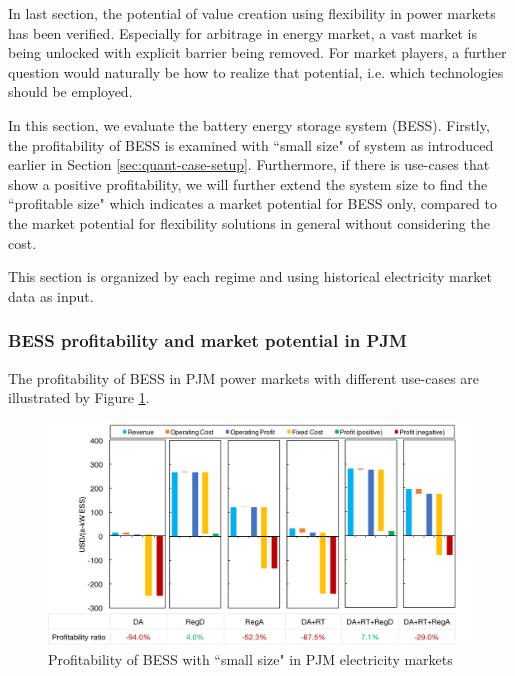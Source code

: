 In last section, the potential of value creation using flexibility in power markets has been verified. Especially for arbitrage in energy market, a vast market is being unlocked with explicit barrier being removed. For market players, a further question would naturally be how to realize that potential, i.e. which technologies should be employed.

In this section, we evaluate the battery energy storage system (BESS). Firstly, the profitability of BESS is examined with ``small size" of system as introduced earlier in Section \ref{sec:quant-case-setup}. Furthermore, if there is use-cases that show a positive profitability, we will further extend the system size to find the ``profitable size" which indicates a market potential for BESS only, compared to the market potential for flexibility solutions in general without considering the cost.

This section is organized by each regime and using historical electricity market data as input.



\subsubsection{BESS profitability and market potential in PJM}

The profitability of BESS in PJM power markets with different use-cases are illustrated by Figure \ref{fig:pjm-ess-profitability}.

\begin{figure}[h!]
	\centering
	\includegraphics[width=0.9\linewidth]{Figures/PJM_ESS_profitability}
	\caption{Profitability of  BESS with ``small size" in PJM electricity markets}
	\label{fig:pjm-ess-profitability}
\end{figure}


